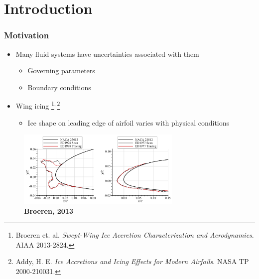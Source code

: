 \documentclass[9pt]{beamer}
\begin{document}
\section{Introduction}
\label{sec-1}
\begin{frame}
\frametitle{Motivation}
\label{sec-1-1}

\begin{itemize}
\item Many fluid systems have uncertainties associated with them
\begin{itemize}
\item Governing parameters
\item Boundary conditions
\end{itemize}
\item Wing icing \footnote{Broeren et. al. \emph{Swept-Wing Ice Accretion Characterization and Aerodynamics}. AIAA 2013-2824.
 }\textsuperscript{,}\,\footnote{Addy, H. E. \emph{Ice Accretions and Icing Effects for Modern Airfoils}. NASA TP 2000-210031.
 }
\begin{itemize}
\item Ice shape on leading edge of airfoil varies with physical conditions
\end{itemize}
\end{itemize}
\begin{figure}[ht]
\centering
\includegraphics[width=0.7\textwidth]{SampleIceShapes} \\
\textbf{Broeren, 2013}
\end{figure}
\end{frame}
\end{document}
